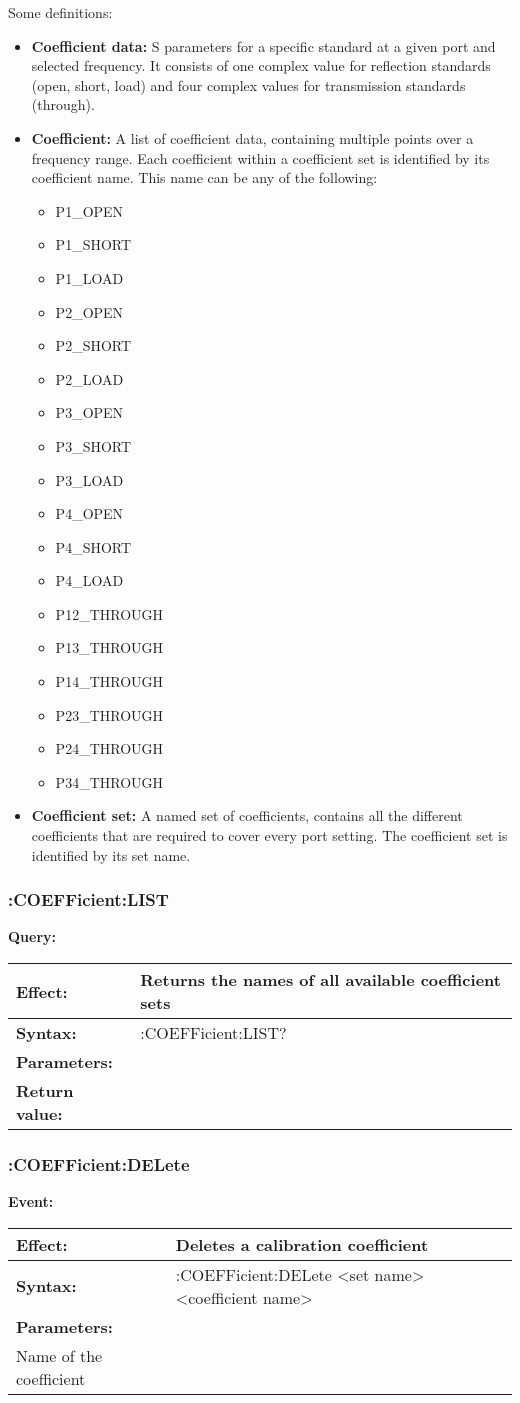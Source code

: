 \documentclass[a4paper,11pt]{article}
\newcommand{\event}[3]{
\noindent\textbf{Event:}
\begin{longtable}{p{.15\textwidth} | p{.80\textwidth} } 
\hline
\textbf{Effect:} & #1 \\ \hline
\textbf{Syntax:} & #2 \\ \hline 
\textbf{Parameters:} & \makecell[Xl]{#3} \\ \hline
\end{longtable}
}
\newcommand{\query}[4]{
\noindent\textbf{Query:}
\begin{longtable}{p{.15\textwidth} | p{.80\textwidth} } 
\hline
\textbf{Effect:} & #1 \\ \hline
\textbf{Syntax:} & #2 \\ \hline 
\textbf{Parameters:} & \makecell[tl]{#3} \\ \hline
\textbf{Return value:} & \makecell[tl]{#4} \\ \hline
\end{longtable}
}
\begin{document}
Some definitions:
\begin{itemize}
\item \textbf{Coefficient data:} S parameters for a specific standard at a given port and selected frequency. It consists of one complex value for reflection standards (open, short, load) and four complex values for transmission standards (through).
\item \textbf{Coefficient:} A list of coefficient data, containing multiple points over a frequency range. Each coefficient within a coefficient set is identified by its coefficient name. This name can be any of the following:
\begin{itemize}
\item P1\_OPEN
\item P1\_SHORT
\item P1\_LOAD
\item P2\_OPEN
\item P2\_SHORT
\item P2\_LOAD
\item P3\_OPEN
\item P3\_SHORT
\item P3\_LOAD
\item P4\_OPEN
\item P4\_SHORT
\item P4\_LOAD
\item P12\_THROUGH
\item P13\_THROUGH
\item P14\_THROUGH
\item P23\_THROUGH
\item P24\_THROUGH
\item P34\_THROUGH
\end{itemize}
\item \textbf{Coefficient set:} A named set of coefficients, contains all the different coefficients that are required to cover every port setting. The coefficient set is identified by its set name.
\end{itemize}
\subsubsection{:COEFFicient:LIST}
\query{Returns the names of all available coefficient sets}{:COEFFicient:LIST?}{NONE}{comma-separated list of coefficient set names}
\subsubsection{:COEFFicient:DELete}
\event{Deletes a calibration coefficient}{:COEFFicient:DELete <set name> <coefficient name>}{<set name> Name of the coefficient set\\<coefficient name> Name of the coefficient}
\end{document}
